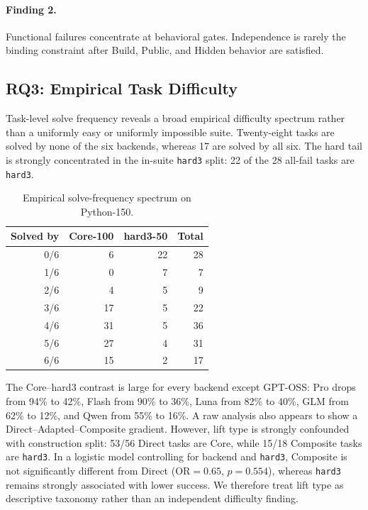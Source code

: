 \documentclass[acmsmall,screen,review,anonymous]{acmart}
\begin{document}
\paragraph{Finding 2.}
Functional failures concentrate at behavioral gates. Independence is rarely the
binding constraint after Build, Public, and Hidden behavior are satisfied.

\subsection{RQ3: Empirical Task Difficulty}

Task-level solve frequency reveals a broad empirical difficulty spectrum rather
than a uniformly easy or uniformly impossible suite. Twenty-eight tasks are solved
by none of the six backends, whereas 17 are solved by all six. The hard tail is
strongly concentrated in the in-suite \texttt{hard3} split: 22 of the 28 all-fail
tasks are \texttt{hard3}.

\begin{table}[t]
  \caption{Empirical solve-frequency spectrum on Python-150.}
  \label{tab:difficulty-spectrum}
  \centering
  \begin{tabular}{rrrr}
    \toprule
    \textbf{Solved by} & \textbf{Core-100} & \textbf{hard3-50} & \textbf{Total} \\
    \midrule
    0/6 & 6 & 22 & 28 \\
    1/6 & 0 & 7 & 7 \\
    2/6 & 4 & 5 & 9 \\
    3/6 & 17 & 5 & 22 \\
    4/6 & 31 & 5 & 36 \\
    5/6 & 27 & 4 & 31 \\
    6/6 & 15 & 2 & 17 \\
    \bottomrule
  \end{tabular}
\end{table}

The Core--hard3 contrast is large for every backend except GPT-OSS: Pro drops from
94\% to 42\%, Flash from 90\% to 36\%, Luna from 82\% to 40\%, GLM from 62\%
to 12\%, and Qwen from 55\% to 16\%. A raw analysis also appears to show a
Direct--Adapted--Composite gradient. However, lift type is strongly confounded with
construction split: 53/56 Direct tasks are Core, while 15/18 Composite tasks are
\texttt{hard3}. In a logistic model controlling for backend and \texttt{hard3},
Composite is not significantly different from Direct (OR$=0.65$, $p=0.554$),
whereas \texttt{hard3} remains strongly associated with lower success. We therefore
treat lift type as descriptive taxonomy rather than an independent difficulty
finding.
\end{document}

